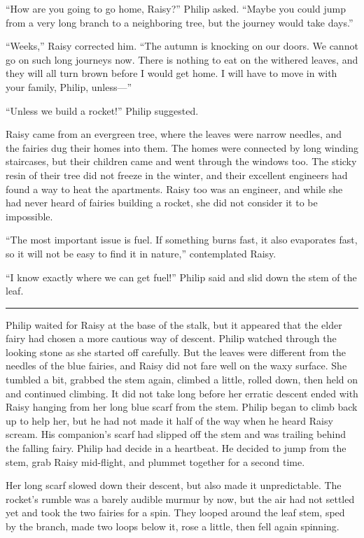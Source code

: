 \documentclass[10pt]{memoir}
\renewcommand{\pfbreakdisplay}{\bigskip \ding{166} \bigskip}
\newcommand{\secbreak}{\fancybreak{\pfbreakdisplay}}
\begin{document}
``How are you going to go home, Raisy?'' Philip asked. ``Maybe you could jump
from a very long branch to a neighboring tree, but the journey would take
days.''

``Weeks,'' Raisy corrected him. ``The autumn is knocking on our doors. We
cannot go on such long journeys now. There is nothing to eat on the withered
leaves, and they will all turn brown before I would get home. I will have to
move in with your family, Philip, unless---''

``Unless we build a rocket!'' Philip suggested.

Raisy came from an evergreen tree, where the leaves were narrow needles, and
the fairies dug their homes into them. The homes were connected by long winding
staircases, but their children came and went through the windows too. The
sticky resin of their tree did not freeze in the winter, and their excellent
engineers had found a way to heat the apartments. Raisy too was an engineer,
and while she had never heard of fairies building a rocket, she did not
consider it to be impossible.

``The most important issue is fuel. If something burns fast, it also evaporates
fast, so it will not be easy to find it in nature,'' contemplated Raisy.

``I know exactly where we can get fuel!'' Philip said and slid down the stem of
the leaf.

\secbreak

Philip waited for Raisy at the base of the stalk, but it appeared that the
elder fairy had chosen a more cautious way of descent. Philip watched through
the looking stone as she started off carefully. But the leaves were different
from the needles of the blue fairies, and Raisy did not fare well on the waxy
surface. She tumbled a bit, grabbed the stem again, climbed a little, rolled
down, then held on and continued climbing. It did not take long before her
erratic descent ended with Raisy hanging from her long blue scarf from the
stem. Philip began to climb back up to help her, but he had not made it half of
the way when he heard Raisy scream. His companion's scarf had slipped off the
stem and was trailing behind the falling fairy. Philip had decide in a
heartbeat. He decided to jump from the stem, grab Raisy mid-flight, and plummet
together for a second time.

Her long scarf slowed down their descent, but also made it unpredictable. The
rocket's rumble was a barely audible murmur by now, but the air had not settled
yet and took the two fairies for a spin. They looped around the leaf stem, sped
by the branch, made two loops below it, rose a little, then fell again
spinning.
\end{document}
